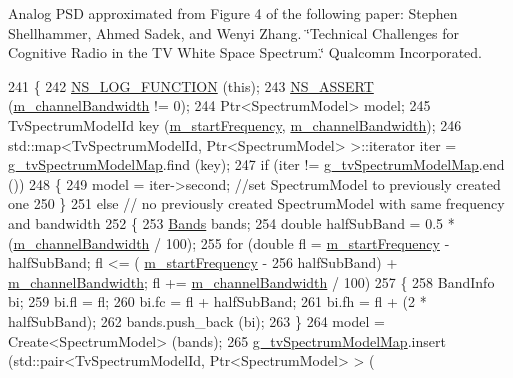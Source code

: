Analog P\+SD approximated from Figure 4 of the following paper\+: Stephen Shellhammer, Ahmed Sadek, and Wenyi Zhang. \char`\"{}\+Technical Challenges for 
\+Cognitive Radio in the T\+V White Space Spectrum.\char`\"{} Qualcomm Incorporated. 
\begin{DoxyCode}
241 \{
242   \hyperlink{log-macros-disabled_8h_a90b90d5bad1f39cb1b64923ea94c0761}{NS\_LOG\_FUNCTION} (\textcolor{keyword}{this});
243   \hyperlink{assert_8h_a6dccdb0de9b252f60088ce281c49d052}{NS\_ASSERT} (\hyperlink{classns3_1_1TvSpectrumTransmitter_a6e9866a446454a46b3a64be122931c95}{m\_channelBandwidth} != 0);
244   Ptr<SpectrumModel> model;
245   TvSpectrumModelId key (\hyperlink{classns3_1_1TvSpectrumTransmitter_a776e1f1e5c91d1d4a457e26b0fc29375}{m\_startFrequency}, \hyperlink{classns3_1_1TvSpectrumTransmitter_a6e9866a446454a46b3a64be122931c95}{m\_channelBandwidth});
246   std::map<TvSpectrumModelId, Ptr<SpectrumModel> >::iterator iter = 
      \hyperlink{namespacens3_af72014a4f217531f5f79af77a80c9b6d}{g\_tvSpectrumModelMap}.find (key);
247   \textcolor{keywordflow}{if} (iter != \hyperlink{namespacens3_af72014a4f217531f5f79af77a80c9b6d}{g\_tvSpectrumModelMap}.end ())
248     \{
249       model = iter->second; \textcolor{comment}{//set SpectrumModel to previously created one}
250     \}
251   \textcolor{keywordflow}{else} \textcolor{comment}{// no previously created SpectrumModel with same frequency and bandwidth}
252     \{
253       \hyperlink{namespacens3_a46ac9188e5cf43bd5292f7b67451246e}{Bands} bands;
254       \textcolor{keywordtype}{double} halfSubBand = 0.5 * (\hyperlink{classns3_1_1TvSpectrumTransmitter_a6e9866a446454a46b3a64be122931c95}{m\_channelBandwidth} / 100);
255       \textcolor{keywordflow}{for} (\textcolor{keywordtype}{double} fl = \hyperlink{classns3_1_1TvSpectrumTransmitter_a776e1f1e5c91d1d4a457e26b0fc29375}{m\_startFrequency} - halfSubBand; fl <= (
      \hyperlink{classns3_1_1TvSpectrumTransmitter_a776e1f1e5c91d1d4a457e26b0fc29375}{m\_startFrequency} - 
256            halfSubBand) + \hyperlink{classns3_1_1TvSpectrumTransmitter_a6e9866a446454a46b3a64be122931c95}{m\_channelBandwidth}; fl += 
      \hyperlink{classns3_1_1TvSpectrumTransmitter_a6e9866a446454a46b3a64be122931c95}{m\_channelBandwidth} / 100)
257         \{
258           BandInfo bi;
259           bi.fl = fl;
260           bi.fc = fl + halfSubBand;
261           bi.fh = fl + (2 * halfSubBand);
262           bands.push\_back (bi);
263         \}
264       model = Create<SpectrumModel> (bands);
265       \hyperlink{namespacens3_af72014a4f217531f5f79af77a80c9b6d}{g\_tvSpectrumModelMap}.insert (std::pair<TvSpectrumModelId, Ptr<SpectrumModel> > (

\end{DoxyCode}
